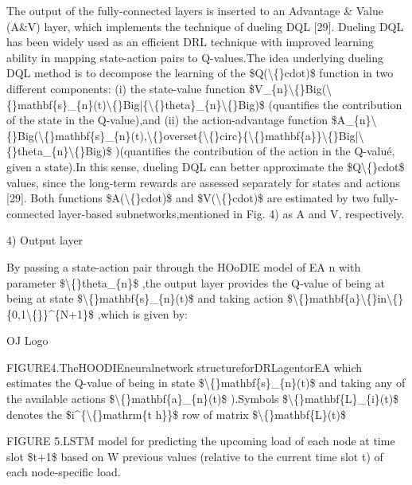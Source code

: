 \documentclass{article}
\begin{document}
The output of the fully-connected layers is inserted to an Advantage \& Value (A\&V) layer, which implements the technique of dueling DQL [29]. Dueling DQL has been widely used as an efficient DRL technique with improved learning ability in mapping state-action pairs to Q-values.The idea underlying dueling DQL method is to decompose the learning of the \$Q(\textbackslash\{\}cdot)\$ function in two different components: (i) the state-value function \$V\_\{n\}\textbackslash\{\}Big(\textbackslash\{\}mathbf\{s\}\_\{n\}(t)\textbackslash\{\}Big|\{\textbackslash\{\}theta\}\_\{n\}\textbackslash\{\}Big)\$ (quantifies the contribution of the state in the Q-value),and (ii) the action-advantage function \$A\_\{n\}\textbackslash\{\}Big(\textbackslash\{\}mathbf\{s\}\_\{n\}(t),\textbackslash\{\}overset\{\textbackslash\{\}circ\}\{\textbackslash\{\}mathbf\{a\}\}\textbackslash\{\}Big|\textbackslash\{\}theta\_\{n\}\textbackslash\{\}Big)\$ )(quantifies the contribution of the action in the Q-valué, given a state).In this sense, dueling DQL can better approximate the \$Q\textbackslash\{\}cdot\$ values, since the long-term rewards are assessed separately for states and actions [29]. Both functions \$A(\textbackslash\{\}cdot)\$ and \$V(\textbackslash\{\}cdot)\$ are estimated by two fully-connected layer-based subnetworks,mentioned in Fig. 4) as A and V, respectively.

4) Output layer

By passing a state-action pair through the HOoDIE model of EA n with parameter \$\textbackslash\{\}theta\_\{n\}\$ ,the output layer provides the Q-value of being at being at state \$\textbackslash\{\}mathbf\{s\}\_\{n\}(t)\$ and taking action \$\textbackslash\{\}mathbf\{a\}\textbackslash\{\}in\textbackslash\{\}\{0,1\textbackslash\{\}\}\textasciicircum{}\{N+1\}\$ ,which is given by:

OJ Logo

FIGURE4.TheHOODIEneuralnetwork structureforDRLagentorEA which estimates the Q-value of being in state \$\textbackslash\{\}mathbf\{s\}\_\{n\}(t)\$ and taking any of the available actions \$\textbackslash\{\}mathbf\{a\}\_\{n\}(t)\$ ).Symbols \$\textbackslash\{\}mathbf\{L\}\_\{i\}(t)\$ denotes the \$i\textasciicircum{}\{\textbackslash\{\}mathrm\{t h\}\}\$ row of matrix \$\textbackslash\{\}mathbf\{L\}(t)\$

FIGURE 5.LSTM model for predicting the upcoming load of each node at time slot \$t+1\$ based on W previous values (relative to the current time slot t) of each node-specific load.
\end{document}
